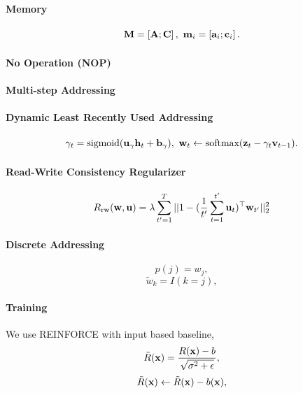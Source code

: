 \documentclass[landscape,a0paper,fontscale=0.285,final]{baposter} %
\begin{document}
\begin{poster}
{\paragraph{Memory}
\[
    \mathbf{M} = \left[ \mathbf{A} ; \mathbf{C} \right], ~
    \mathbf{m}_i = \left[ \mathbf{a}_i ; \mathbf{c}_i \right].
\]

\paragraph{No Operation (NOP)}

\paragraph{Multi-step Addressing}


\paragraph{Dynamic Least Recently Used Addressing}

\[
       \gamma_t = \text{sigmoid}(\mathbf{u}_{\gamma} \mathbf{h}_t + \mathbf{b}_{\gamma}),~
       \mathbf{w}_t \leftarrow \text{softmax}(\mathbf{z}_t - \gamma_t \mathbf{v}_{t-1}).
\]

\paragraph{Read-Write Consistency Regularizer}
\begin{align*}
    R_{\text{rw}}(\mathbf{w}, \mathbf{u}) = \lambda \sum_{t'=1}^{T}||1 -
    (\frac{1}{t'}\sum_{t=1}^{t'}\mathbf{u}_t)^{\top}\mathbf{w}_{t'} ||_2^2
\end{align*}
\paragraph{Discrete Addressing} 

\[
    p(j) = w_j,
\]
\[
    \tilde{w}_k = I(k=j),
\]

\paragraph{Training}
We use REINFORCE with input based baseline, 
\[
\tilde{R}(\mathbf{x}) = \frac{R(\mathbf{x}) - b}{\sqrt{\sigma^2 + \epsilon}},
\]
\[
\tilde{R}(\mathbf{x}) \leftarrow \tilde{R}(\mathbf{x}) - b(\mathbf{x}),
\]

}
\end{poster}
\end{document}
